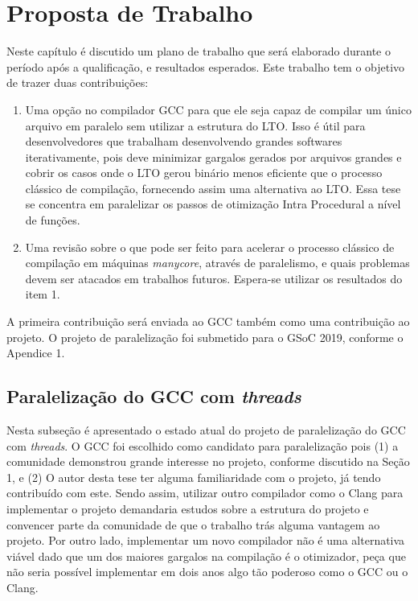 \chapter{Proposta de Trabalho}
\label{chap:proposta}

Neste capítulo é discutido um plano de trabalho que será elaborado
durante o período após a qualificação, e resultados esperados.
Este trabalho tem o objetivo de trazer duas contribuições:
\begin{enumerate}
    \item Uma opção no compilador GCC para que ele seja
capaz de compilar um único arquivo em paralelo sem utilizar a
estrutura do LTO. Isso é útil para desenvolvedores que trabalham
desenvolvendo grandes softwares iterativamente, pois deve minimizar
gargalos gerados por arquivos grandes e cobrir os casos onde o LTO gerou
binário menos eficiente que o processo clássico de compilação, fornecendo assim
uma alternativa ao LTO.
Essa tese se concentra em paralelizar os passos de otimização Intra Procedural
a nível de funções.

    \item Uma revisão sobre o que pode ser feito para acelerar o
processo clássico de compilação em máquinas \textit{manycore}, através
de paralelismo, e quais problemas devem ser atacados em trabalhos futuros.
Espera-se utilizar os resultados do item 1.
\end{enumerate}

A primeira contribuição será enviada ao GCC também como uma contribuição
ao projeto. O projeto de paralelização foi submetido para o GSoC 2019,
conforme o Apendice 1.


\section{Paralelização do GCC com \textit{threads}}

Nesta subseção é apresentado o estado atual do projeto de paralelização
do GCC com \textit{threads}. O GCC foi escolhido como candidato para
paralelização pois (1) a comunidade demonstrou grande interesse no projeto,
conforme discutido na Seção 1, e (2) O autor desta tese ter alguma
familiaridade com o projeto, já tendo contribuído com este. Sendo assim,
utilizar outro compilador como o Clang para implementar o projeto demandaria
estudos sobre a estrutura do projeto e convencer parte da comunidade de que
o trabalho trás alguma vantagem ao projeto. Por outro lado, implementar um
novo compilador não é uma alternativa viável dado que um dos maiores gargalos
na compilação é o otimizador, peça que não seria possível implementar em
dois anos algo tão poderoso como o GCC ou o Clang.

